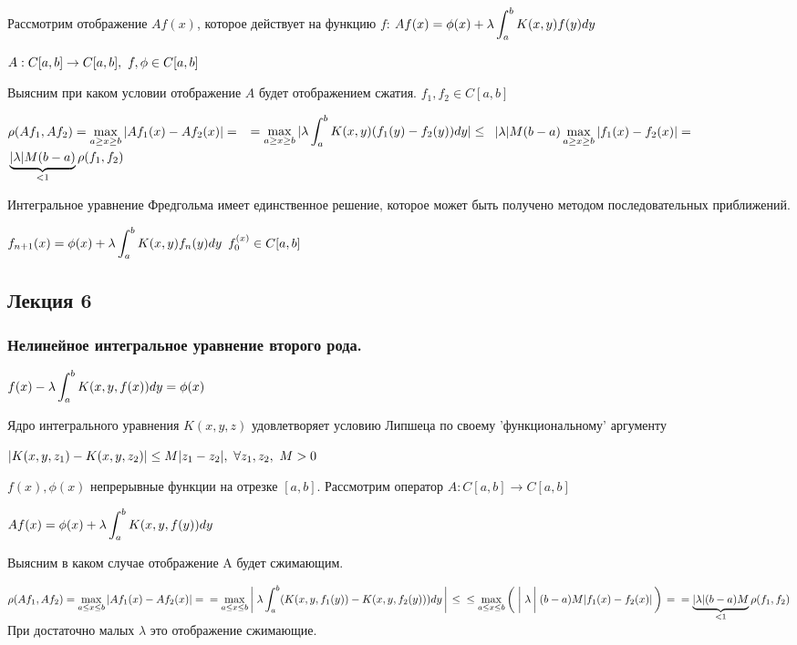 \documentclass[12pt]{report}
\renewcommand{\[}{$\\\displaystyle}
\renewcommand{\]}{\\$}
\renewcommand{\[}{$\\\displaystyle}
\newcommand{\sep}{,\ }
\newcommand{\bb}[1][]{\left#1\vphantom{\int_1^2}\right.}
\begin{document}
Рассмотрим отображение $Af(x)$, которое действует на функцию $f$:
\[ Af(x)=\phi(x)+\lambda\int_a^bK(x,y)f(y)dy\]

\[ A: C[a, b]\rightarrow C[a,b]\sep f,\phi \in C[a,b]\]

Выясним при каком условии отображение $A$ будет отображением сжатия. $f_1, f_2 \in C[a,b]$

\[ \rho(Af_1,Af_2)=\max_{a\geq x \geq b}|Af_1(x)-Af_2(x)|=\]
\[ =\max_{a\geq x \geq b} |\lambda\int_a^bK(x, y)(f_1(y)-f_2(y))dy|\leq\]
\[ |\lambda|M(b-a)\max_{a\geq x \geq b}|f_1(x)-f_2(x)|=\]
\[ \underbrace{|\lambda|M(b-a)}_{<1}\rho(f_1,f_2) \]

Интегральное уравнение Фредгольма имеет единственное решение, которое может быть получено методом последовательных приближений.

\[ f_{n+1}(x)=\phi(x)+\lambda\int_a^bK(x,y)f_n(y)dy\]
\[ f_0^{(x)} \in C[a,b]\]

\subsection{Лекция 6}

\subsubsection{Нелинейное интегральное уравнение второго рода.}

\[ f(x)-\lambda\int_a^bK(x,y,f(x))dy=\phi(x)\]

Ядро интегрального уравнения $K(x,y,z)$ удовлетворяет условию Липшеца по своему 'функциональному' аргументу

\[|K(x,y,z_1)-K(x,y,z_2)|\leq M|z_1-z_2|\sep\forall z_1,z_2\sep M>0\]


$f(x), \phi(x)$ непрерывные функции на отрезке $[a,b]$. Рассмотрим оператор $A:C[a,b]\rightarrow C[a,b]$

\[ Af(x) = \phi(x)+\lambda\int_a^bK(x,y,f(y))dy \]

Выясним в каком случае отображение A будет сжимающим.

\[ \rho(Af_1, Af_2) = \max_{a\leq x\leq b}|Af_1(x)-Af_2(x)|=\\=
\max_{a\leq x\leq b}\bb[|]\lambda\int_a^b(K(x,y,f_1(y))-K(x,y,f_2(y)))dy\bb[|]\leq\\\leq
\max_{a\leq x\leq b}\bb[(]\bb[|]\lambda\bb[|](b-a)M|f_1(x)-f_2(x)|\bb[)] = \\
= \underbrace{|\lambda|(b-a)M}_{<1}\rho(f_1,f_2)
\]
При достаточно малых $\lambda$ это отображение сжимающие.
\end{document}
